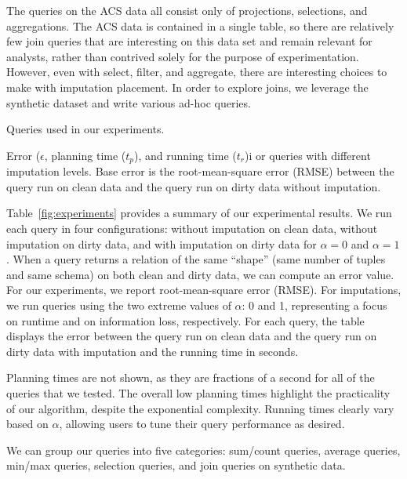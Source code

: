 The queries on the ACS data all consist only of projections, selections, and aggregations.
The ACS data is contained in a single table, so there are relatively few join queries that are interesting on this data set and remain relevant for analysts, rather
than contrived solely for the purpose of experimentation.
However, even with select, filter, and aggregate, there are interesting choices to make with imputation placement. In order to explore joins, we leverage the synthetic
dataset and write various ad-hoc queries.

\begin{table}
  \centerfloat
  
  \caption{Queries used in our experiments.}
  \label{fig:queries}
\end{table}

\begin{table}
  \centerfloat
  
    \caption{Error ($\epsilon$, planning time ($t_p$), and running time ($t_r$)i or queries
    with different imputation levels. Base error is the root-mean-square error (RMSE) between the query run on clean
    data and the query run on dirty data without imputation.}
  \label{fig:experiments}
\end{table}

Table~\ref{fig:experiments} provides a summary of our experimental results.
We run each query in four configurations: without imputation on clean data, without imputation on dirty data, and with imputation on dirty data for $\alpha = 0$ and $\alpha = 1$.
When a query returns a relation of the same ``shape'' (same number of tuples and same schema) on both clean and dirty data, we can compute an error value.
For our experiments, we report root-mean-square error (RMSE).
For imputations, we run queries using the two extreme values of $\alpha$: 0 and 1, representing a focus on runtime and on information loss, respectively.
For each query, the table displays the error between the query run on clean data and the query run on dirty data with imputation and the running time in seconds.

Planning times are not shown, as they are fractions of a second for all of the queries that we tested.
The overall low planning times highlight the practicality of our algorithm, despite the exponential complexity.
Running times clearly vary based on $\alpha$, allowing users to tune their query performance as desired.

We can group our queries into five categories: sum/count queries, average queries, min/max queries, selection queries, and join queries on synthetic data.

